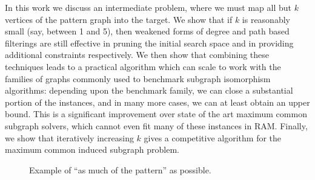 \documentclass[letterpaper]{article}
\theoremstyle{definition}
\begin{document}
In this work we discuss an intermediate problem, where we must map all but $k$ vertices of the
pattern graph into the target. We show that if $k$ is reasonably small (say, between 1 and 5), then
weakened forms of degree and path based filterings are still effective in pruning the initial search
space and in providing additional constraints respectively. We then show that combining these
techniques leads to a practical algorithm which can scale to work with the families of graphs
commonly used to benchmark subgraph isomorphism algorithms: depending upon the benchmark family, we
can close a substantial portion of the instances, and in many more cases, we can at least obtain an
upper bound. This is a significant improvement over state of the art maximum common subgraph
solvers, which cannot even fit many of these instances in RAM. Finally, we show that iteratively
increasing $k$ gives a competitive algorithm for the maximum common induced subgraph problem.

\begin{figure}
    \begin{center}
        \caption{Example of  ``as much of the pattern'' as possible.}
        \label{fig:subgraphexample}
    \end{center}
\end{figure}
\end{document}
